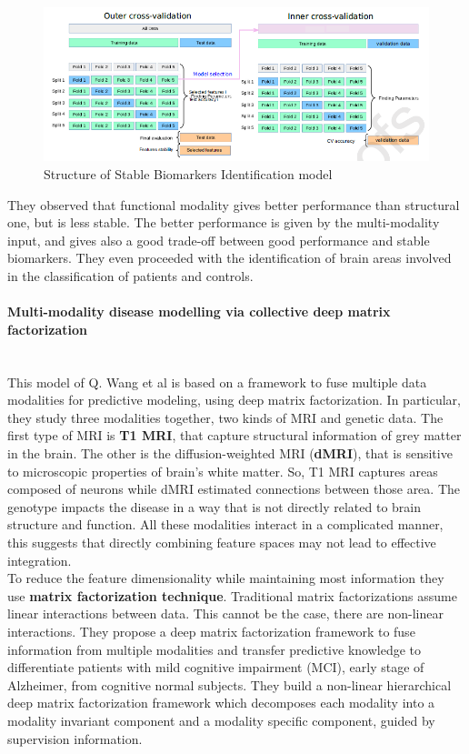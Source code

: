 \begin{figure}[htbp]
	\centering
	\includegraphics[scale=0.65]{Immagini/stablebiomarkers.PNG}
	\caption{Structure of Stable Biomarkers Identification model}
	\label{fig:diagram18}
\end{figure}

They observed that functional modality gives better performance than structural one, but is less stable. The better performance is given by the multi-modality input, and gives also a good trade-off between good performance and stable biomarkers. They even proceeded with the identification of brain areas involved in the classification of patients and controls.

\paragraph{Multi-modality disease modelling via collective deep matrix factorization}\
\\

This model of Q. Wang et al \cite{10.1145/3097983.3098164} is based on a framework to fuse multiple data modalities for predictive modeling, using deep matrix factorization. In particular, they study three modalities together, two kinds of MRI and genetic data. The first type of MRI is \textbf{T1 MRI}, that capture structural information of grey matter in the brain. The other is the diffusion-weighted MRI (\textbf{dMRI}), that is sensitive to microscopic properties of brain's white matter. So, T1 MRI captures areas composed of neurons while dMRI estimated connections between those area. The genotype impacts the disease in a way that is not directly related to brain structure and function. All these modalities interact in a complicated manner, this suggests that directly combining feature spaces may not lead to effective integration.
\\

To reduce the feature dimensionality while maintaining most information they use \textbf{matrix factorization technique}. Traditional matrix factorizations assume linear interactions between data. This cannot be the case, there are non-linear interactions. They propose a deep matrix factorization framework to fuse information from multiple modalities and transfer predictive knowledge to differentiate patients with mild cognitive impairment (MCI), early stage of Alzheimer, from cognitive normal subjects. They build a non-linear hierarchical deep matrix factorization framework which decomposes each modality into a modality invariant component and a modality specific component, guided by supervision information. 
\\

